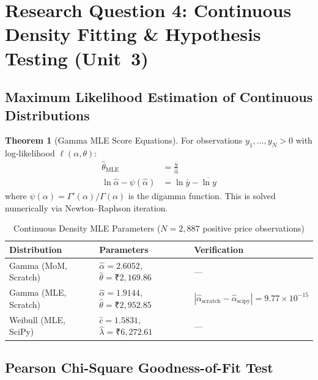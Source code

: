 \documentclass[12pt, a4paper]{article}
\theoremstyle{definition}
\newtheorem{theorem}{Theorem}[section]
\begin{document}
\section{Research Question 4: Continuous Density Fitting \& Hypothesis Testing (Unit~3)}

\subsection{Maximum Likelihood Estimation of Continuous Distributions}

\begin{theorem}[Gamma MLE Score Equations]
For observations $y_1, \ldots, y_N > 0$ with log-likelihood $\ell(\alpha, \theta)$:
\begin{align}
    \hat{\theta}_{\text{MLE}} &= \frac{\bar{y}}{\hat{\alpha}} \\
    \ln \hat{\alpha} - \psi(\hat{\alpha}) &= \ln \bar{y} - \overline{\ln y}
\end{align}
where $\psi(\alpha) = \Gamma'(\alpha)/\Gamma(\alpha)$ is the digamma function. This is solved numerically via Newton--Raphson iteration.
\end{theorem}

\begin{table}[H]
\centering
\caption{Continuous Density MLE Parameters ($N = 2{,}887$ positive price observations)}
\label{tab:continuous_mle}
\begin{tabular}{l l l}
\toprule
\textbf{Distribution} & \textbf{Parameters} & \textbf{Verification} \\
\midrule
Gamma (MoM, Scratch) & $\hat{\alpha} = 2.6052$, $\hat{\theta} = \text{₹}2{,}169.86$ & --- \\
Gamma (MLE, Scratch) & $\hat{\alpha} = 1.9144$, $\hat{\theta} = \text{₹}2{,}952.85$ & $|\hat{\alpha}_{\text{scratch}} - \hat{\alpha}_{\text{scipy}}| = 9.77 \times 10^{-15}$ \\
Weibull (MLE, SciPy) & $\hat{c} = 1.5831$, $\hat{\lambda} = \text{₹}6{,}272.61$ & --- \\
\bottomrule
\end{tabular}
\end{table}

\subsection{Pearson Chi-Square Goodness-of-Fit Test}
\end{document}
